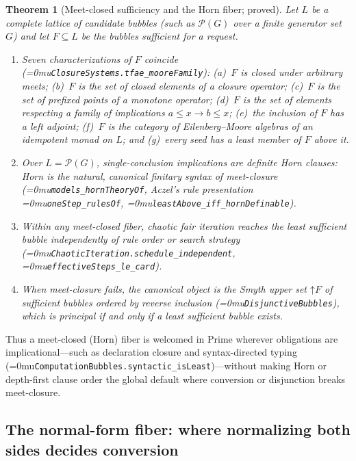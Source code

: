 \documentclass[11pt]{article}
\newcommand{\leanname}[1]{\textup{\Urlmuskip=0mu\relax\nolinkurl{#1}}}
\newtheorem{theorem}{Theorem}
\theoremstyle{definition}
\theoremstyle{remark}
\begin{document}
\begin{theorem}[Meet-closed sufficiency and the Horn fiber; proved]
Let $L$ be a complete lattice of candidate bubbles (such as $\mathcal{P}(G)$ over
a finite generator set $G$) and let $F \subseteq L$ be the bubbles sufficient
for a request.
\begin{enumerate}[leftmargin=*]
\item Seven characterizations of $F$ coincide
  (\leanname{ClosureSystems.tfae_mooreFamily}): (a)~$F$ is closed under
  arbitrary meets; (b)~$F$ is the set of closed elements of a closure operator;
  (c)~$F$ is the set of prefixed points of a monotone operator; (d)~$F$ is the
  set of elements respecting a family of implications $a \le x \to b \le x$;
  (e)~the inclusion of $F$ has a left adjoint; (f)~$F$ is the category of
  Eilenberg--Moore algebras of an idempotent monad on $L$; and (g)~every seed
  has a least member of $F$ above it.
\item Over $L = \mathcal{P}(G)$, single-conclusion implications are definite
  Horn clauses: Horn is the natural, canonical finitary syntax of meet-closure
  (\leanname{models_hornTheoryOf}, Aczel's rule presentation
  \leanname{oneStep_rulesOf}, \leanname{leastAbove_iff_hornDefinable}).
\item Within any meet-closed fiber, chaotic fair iteration reaches the least
  sufficient bubble independently of rule order or search strategy
  (\leanname{ChaoticIteration.schedule_independent},
  \leanname{effectiveSteps_le_card}).
\item When meet-closure fails, the canonical object is the Smyth upper set
  $\mathord{\uparrow}F$ of sufficient bubbles ordered by reverse inclusion
  (\leanname{DisjunctiveBubbles}), which is principal if and only if a least
  sufficient bubble exists.
\end{enumerate}
\end{theorem}

Thus a meet-closed (Horn) fiber is welcomed in Prime wherever obligations are
implicational---such as declaration closure and syntax-directed typing
(\leanname{ComputationBubbles.syntactic_isLeast})---without making Horn or
depth-first clause order the global default where conversion or disjunction
breaks meet-closure.

\subsection{The normal-form fiber: where normalizing both sides decides conversion}
\label{sec:normal-form-fiber}
\end{document}

